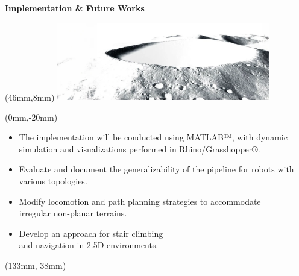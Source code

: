 \documentclass[11pt,aspectratio=169]{beamer}
\begin{document}
\begin{frame}[fragile]{\textbf{Implementation \& Future Works}}


    \begin{textblock*}{5cm}(46mm,8mm) %
    \includegraphics[height=34mm]{elements/[26]-Future.png}
    \end{textblock*}

    \begin{textblock*}{130mm}(0mm,-20mm)
    \vspace{2mm}
    \begin{itemize}
        \item The implementation will be conducted using MATLAB™, with dynamic simulation and visualizations performed in Rhino/Grasshopper®.
        \item Evaluate and document the generalizability of the pipeline for robots with various topologies.
        \item Modify locomotion and path planning 
        strategies to accommodate \\ 
        irregular non-planar terrains.
        \item Develop an approach for stair climbing \\
        and navigation in 2.5D environments.
    \end{itemize}
    \end{textblock*}

    \begin{textblock*}{5cm}(133mm, 38mm) %
    {\tiny \cite{9477154}}
    \end{textblock*}

    \vspace{10mm}

\end{frame}
\end{document}
